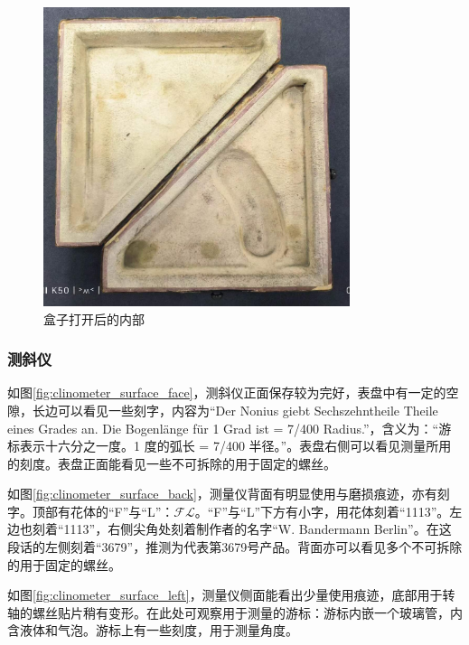 \documentclass[UTF8]{ctexart}
\begin{document}
\begin{figure}[h]
    \begin{minipage}[t]{0.33\textwidth}
        \centering
        \includegraphics[width=0.8\textwidth]{img/box_surface_inside.jpg}
        \caption{盒子打开后的内部}
    \label{fig:box_surface_inside}
    \end{minipage}
\end{figure}

\subsubsection{测斜仪}

如图\ref{fig:clinometer_surface_face}，测斜仪正面保存较为完好，表盘中有一定的空隙，长边可以看见一些刻字，内容为“Der Nonius giebt Sechszehntheile Theile eines Grades an. Die Bogenlänge für 1 Grad ist = 7/400 Radius.”，含义为：“游标表示十六分之一度。1 度的弧长 = 7/400 半径。”。表盘右侧可以看见测量所用的刻度。表盘正面能看见一些不可拆除的用于固定的螺丝。

如图\ref{fig:clinometer_surface_back}，测量仪背面有明显使用与磨损痕迹，亦有刻字。顶部有花体的“F”与“L”：$\mathcal{F} \mathcal{L}$。“F”与“L”下方有小字，用花体刻着“1113”。左边也刻着“1113”，右侧尖角处刻着制作者的名字“W. Bandermann Berlin”。在这段话的左侧刻着“3679”，推测为代表第3679号产品\cite{laoxiangji}。背面亦可以看见多个不可拆除的用于固定的螺丝。

如图\ref{fig:clinometer_surface_left}，测量仪侧面能看出少量使用痕迹，底部用于转轴的螺丝贴片稍有变形。在此处可观察用于测量的游标：游标内嵌一个玻璃管，内含液体和气泡。游标上有一些刻度，用于测量角度。
\end{document}
